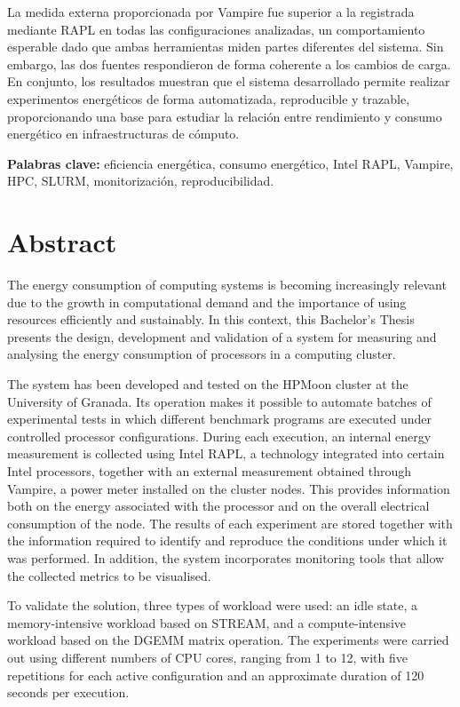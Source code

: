 La medida externa proporcionada por Vampire fue superior a la registrada mediante RAPL en todas las configuraciones analizadas, un comportamiento esperable dado que ambas herramientas miden partes diferentes del sistema. Sin embargo, las dos fuentes respondieron de forma coherente a los cambios de carga. En conjunto, los resultados muestran que el sistema desarrollado permite realizar experimentos energéticos de forma automatizada, reproducible y trazable, proporcionando una base para estudiar la relación entre rendimiento y consumo energético en infraestructuras de cómputo.

\textbf{Palabras clave:} eficiencia energética, consumo energético, Intel RAPL, Vampire, HPC, SLURM, monitorización, reproducibilidad.


\chapter*{Abstract}

The energy consumption of computing systems is becoming increasingly relevant due to the growth in computational demand and the importance of using resources efficiently and sustainably. In this context, this Bachelor's Thesis presents the design, development and validation of a system for measuring and analysing the energy consumption of processors in a computing cluster.

The system has been developed and tested on the HPMoon cluster at the University of Granada. Its operation makes it possible to automate batches of experimental tests in which different benchmark programs are executed under controlled processor configurations. During each execution, an internal energy measurement is collected using Intel RAPL, a technology integrated into certain Intel processors, together with an external measurement obtained through Vampire, a power meter installed on the cluster nodes. This provides information both on the energy associated with the processor and on the overall electrical consumption of the node. The results of each experiment are stored together with the information required to identify and reproduce the conditions under which it was performed. In addition, the system incorporates monitoring tools that allow the collected metrics to be visualised.

To validate the solution, three types of workload were used: an idle state, a memory-intensive workload based on STREAM, and a compute-intensive workload based on the DGEMM matrix operation. The experiments were carried out using different numbers of CPU cores, ranging from 1 to 12, with five repetitions for each active configuration and an approximate duration of 120 seconds per execution.

